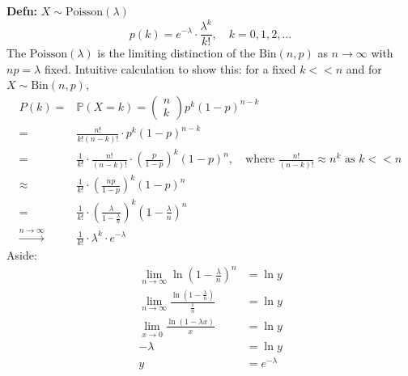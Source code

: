 \documentclass[a4paper]{article}
\newcommand{\n}{\hfill\break}
\newcommand{\defn}[1]{\par\noindent\settowidth{\hangindent}{\textbf{Defn: }}\textbf{Defn: }#1\n}
\newcommand{\Prob}{\mathbb{P}}
\renewcommand{\P}{\Prob}
\begin{document}
\defn{$X\sim\text{Poisson}(\lambda)$
\[p(k)=e^{-\lambda}\cdot\frac{\lambda^k}{k!},\quad k=0, 1, 2, \dots\]
The $\text{Poisson}(\lambda)$ is the limiting distinction of the $\text{Bin}(n, p)$ as $n\rightarrow\infty$ with $np=\lambda$ fixed. Intuitive calculation to show this: for a fixed $k<<n$ and for $X\sim\text{Bin}(n, p)$,
\begin{align*}
    P(k)=&\P(X=k)=\begin{pmatrix}n\\k\end{pmatrix}p^k(1-p)^{n-k} \\
    =&\frac{n!}{k!(n-k)!}\cdot p^k(1-p)^{n-k} \\
    =&\frac{1}{k!}\cdot\frac{n!}{(n-k)!}\cdot\left(\frac{p}{1-p}\right)^k(1-p)^n, \quad\text{where $\frac{n!}{(n-k)!}\approx n^k$ as $k<<n$} \\
    \approx& \frac{1}{k!}\cdot\left(\frac{np}{1-p}\right)^k(1-p)^n \\
    =&\frac{1}{k!}\cdot\left(\frac{\lambda}{1-\frac{\lambda}{n}}\right)^k\left(1-\frac{\lambda}{n}\right)^n \\
    \xrightarrow{n\rightarrow\infty}&\frac{1}{k!}\cdot\lambda^k\cdot e^{-\lambda}
\end{align*}
Aside:
\begin{align*}
    \lim_{n\rightarrow\infty}\ln{\left(1-\frac{\lambda}{n}\right)^n}&=\ln{y} \\
    \lim_{n\rightarrow\infty}\frac{\ln{\left(1-\frac{\lambda}{n}\right)}}{\frac{1}{n}}&=\ln{y} \\
    \lim_{x\rightarrow0}\frac{\ln{(1-\lambda x)}}{x}&=\ln{y} \\
    -\lambda&=\ln{y} \\
    y&=e^{-\lambda}
\end{align*}
}



\end{document}
